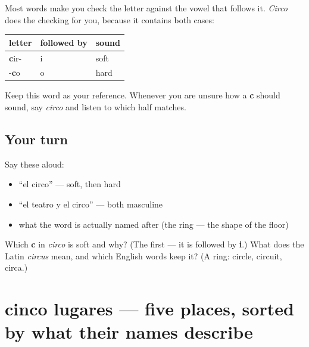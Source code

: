 \begin{grammarlens}[title={Grammar Lens: the rule you can see inside one word}]
Most words make you check the letter against the vowel that follows it. \emph{Circo} does the checking for you, because it contains both cases:

\noindent
\begin{tabularx}{\linewidth}{@{}>{\raggedright\arraybackslash}X>{\raggedright\arraybackslash}X>{\raggedright\arraybackslash}X@{}}
\toprule
\textbf{letter} & \textbf{followed by} & \textbf{sound} \\
\midrule
\textbf{c}ir- & i & soft \\
-\textbf{c}o & o & hard \\
\bottomrule
\end{tabularx}

Keep this word as your reference. Whenever you are unsure how a \textbf{c} should sound, say \emph{circo} and listen to which half matches.
\end{grammarlens}

\subsection*{Your turn}
Say these aloud:

\begin{itemize}
\raggedright
  \item \textquotedblleft{}el circo\textquotedblright{} — soft, then hard
  \item \textquotedblleft{}el teatro y el circo\textquotedblright{} — both masculine
  \item what the word is actually named after (the ring — the shape of the floor)
\end{itemize}

\begin{tcolorbox}[breakable,colback=teal!4,colframe=teal!35!black,title={Before you move on}]
Which \textbf{c} in \emph{circo} is soft and why? (The first — it is followed by \textbf{i}.) What does the Latin \emph{circus} mean, and which English words keep it? (A ring: circle, circuit, circa.)
\end{tcolorbox}
\section[cinco lugares]{cinco lugares — five places, sorted by what their names describe}

\label{lesson:ES-C420-repaso-lugares}



